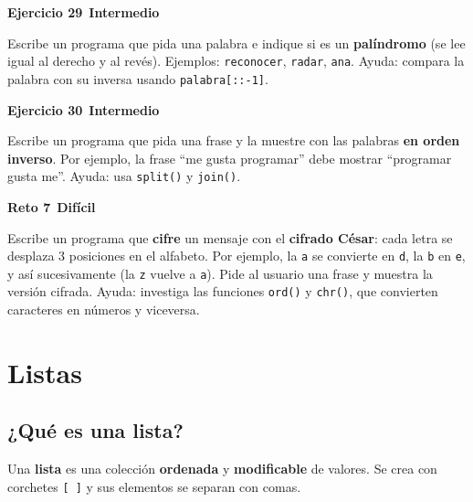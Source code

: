 \documentclass[11pt,a4paper]{article}
\newcommand{\intermedio}{\textcolor{naranjaVivo}{\faIcon{circle}\,\textbf{Intermedio}}}
\newcommand{\dificil}{\textcolor{rojoAlerta}{\faIcon{circle}\,\textbf{Difícil}}}
\begin{document}
\begin{cajaEjercicio}
\textbf{Ejercicio 29} \intermedio

Escribe un programa que pida una palabra e indique si es un \textbf{palíndromo} (se lee igual al derecho y al revés). Ejemplos: \texttt{reconocer}, \texttt{radar}, \texttt{ana}. Ayuda: compara la palabra con su inversa usando \texttt{palabra[::-1]}.
\end{cajaEjercicio}

\begin{cajaEjercicio}
\textbf{Ejercicio 30} \intermedio

Escribe un programa que pida una frase y la muestre con las palabras \textbf{en orden inverso}. Por ejemplo, la frase ``me gusta programar'' debe mostrar ``programar gusta me''. Ayuda: usa \texttt{split()} y \texttt{join()}.
\end{cajaEjercicio}

\begin{cajaReto}
\textbf{Reto 7} \dificil

Escribe un programa que \textbf{cifre} un mensaje con el \textbf{cifrado César}: cada letra se desplaza 3 posiciones en el alfabeto. Por ejemplo, la \texttt{a} se convierte en \texttt{d}, la \texttt{b} en \texttt{e}, y así sucesivamente (la \texttt{z} vuelve a \texttt{a}). Pide al usuario una frase y muestra la versión cifrada. Ayuda: investiga las funciones \texttt{ord()} y \texttt{chr()}, que convierten caracteres en números y viceversa.
\end{cajaReto}

\section{Listas}

\subsection{¿Qué es una lista?}

Una \textbf{lista} es una colección \textbf{ordenada} y \textbf{modificable} de valores. Se crea con corchetes \texttt{[ ]} y sus elementos se separan con comas.
\end{document}
